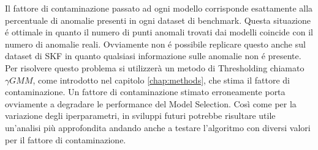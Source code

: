 Il fattore di contaminazione passato ad ogni modello corrisponde esattamente alla percentuale di anomalie presenti in ogni dataset di benchmark. Questa situazione é ottimale in quanto il numero di punti anomali trovati dai modelli coincide con il numero di anomalie reali. Ovviamente non é possibile replicare questo anche sul dataset di SKF in quanto qualsiasi informazione sulle anomalie non é presente. Per risolvere questo problema si utilizzerà un metodo di Thresholding chiamato ${\gamma}GMM$, come introdotto nel capitolo \ref{chap:methods}, che stima il fattore di contaminazione. Un fattore di contaminazione stimato erroneamente porta ovviamente a degradare le performance del Model Selection. Così come per la variazione degli iperparametri, in sviluppi futuri potrebbe risultare utile un'analisi più approfondita andando anche a testare l'algoritmo con diversi valori per il fattore di contaminazione.



